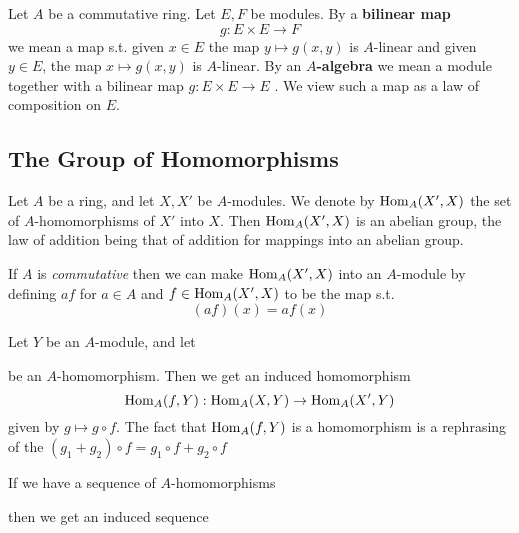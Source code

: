\documentclass[11pt]{article}
\begin{document}
Let \(A\) be a commutative ring. Let \(E,F\) be modules. By a \textbf{bilinear map}
\begin{equation*}
g:E\times E\to F
\end{equation*}
we mean a map s.t. given \(x\in E\) the map \(y\mapsto g(x,y)\) is \(A\)-linear and given \(y\in E\), the
map \(x\mapsto g(x,y)\) is \(A\)-linear. By an \textbf{\(A\)-algebra} we mean a module together with a bilinear
map \(g:E\times E\to E\) . We view such a map as a law of composition on \(E\).

\subsection{The Group of Homomorphisms}
\label{sec:org62e70f8}
Let \(A\) be a ring, and let \(X,X'\) be \(A\)-modules. We denote by \(\operatorname{Hom}_A(X',X)\) the set
of \(A\)-homomorphisms of \(X'\) into \(X\). Then \(\operatorname{Hom}_A(X',X)\) is an abelian group, the law
of addition being that of addition for mappings into an abelian group.

If \(A\) is \emph{commutative} then we can make \(\operatorname{Hom}_A(X',X)\) into an \(A\)-module by defining \(af\)
for \(a\in A\) and \(f\in\operatorname{Hom}_A(X',X)\) to be the map s.t.
\begin{equation*}
(af)(x)=af(x)
\end{equation*}

Let \(Y\) be an \(A\)-module, and let
\begin{center}\end{center}
be an \(A\)-homomorphism. Then we get an induced homomorphism
\begin{equation*}
\operatorname{Hom}_A(f,Y):\operatorname{Hom}_{A}(X,Y)\to\operatorname{Hom}_A(X',Y)
\end{equation*}
given by \(g\mapsto g\circ f\). The fact that \(\operatorname{Hom}_A(f,Y)\) is a homomorphism is a rephrasing of the
\((g_1+g_2)\circ f=g_1\circ f+g_2\circ f\)

If we have a sequence of \(A\)-homomorphisms
\begin{center}\end{center}
then we get an induced sequence
\begin{center}\end{center}
\end{document}
